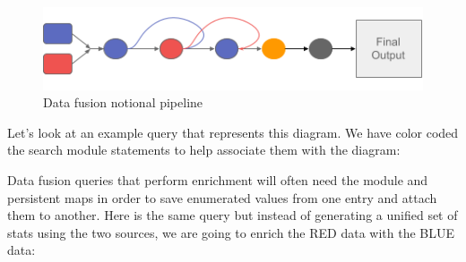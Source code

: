 \begin{figure}
	\includegraphics{images/data-fusion-pipeline.png}
	\caption{Data fusion notional pipeline}
	\label{fig:data-fusion-pipeline}
\end{figure}

Let's look at an example query that represents this diagram. We have
color coded the search module statements to help associate them with the
diagram:


Data fusion queries that perform enrichment will often need the
 module and persistent maps in order to save enumerated values
from one entry and attach them to another. Here is the same query but
instead of generating a unified set of stats using the two sources, we
are going to enrich the RED data with the BLUE data:


